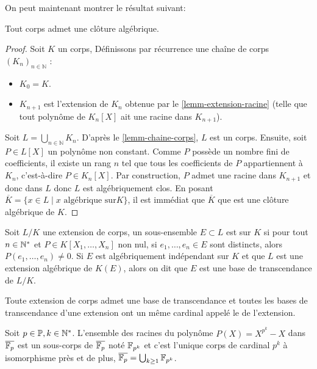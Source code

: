 On peut maintenant montrer le résultat suivant:

\begin{prop}\label{prop-existence-cloture-algebrique}
Tout corps admet une clôture algébrique.
\end{prop}

\begin{proof}
    Soit $K$ un corps,
    Définissons par récurrence une chaîne de corps $(K_n)_{n \in \mathbb{N}}$ :
    \begin{itemize}
        \item $K_0 = K$.
        \item $K_{n+1}$ est l'extension de $K_n$ obtenue par le \cref{lemm-extension-racine} (telle que tout polynôme de $K_n[X]$ ait une racine dans $K_{n+1}$).
    \end{itemize}
    
    Soit $L = \bigcup_{n \in \mathbb{N}} K_n$. D'après le \cref{lemm-chaine-corps}, $L$ est un corps.
    Ensuite, soit $P \in L[X]$ un polynôme non constant. 
    Comme $P$ possède un nombre fini de coefficients, il existe un rang $n$ tel que tous les coefficients de $P$ appartiennent à $K_n$, c'est-à-dire $P \in K_n[X]$.
    Par construction, $P$ admet une racine dans $K_{n+1}$ et donc dans $L$ donc
    $L$ est algébriquement clos.
    En posant $\overline{K}=  \{ x \in L \mid x \text{ algébrique sur} K \}$, il
    est immédiat que $\overline{K}$ que est une clôture algébrique de $K$.
\end{proof}


\begin{defi}
Soit $L/K$ une extension de corps, un sous-ensemble $E \subset L$ est
 sur $K$ si pour tout $n \in \mathbb{N}^{*}$ et $P \in
K[X_1, \ldots, X_n]$ non nul, si $e_1, \ldots, e_n \in E$ sont distincts, alors
$P(e_1,\ldots, e_n) \neq 0$.
Si $E$ est algébriquement indépendant sur $K$ et que $L$ est une extension algébrique de
$K(E)$, alors on dit que $E$ est une base de transcendance de $L/K$.
\end{defi}

\begin{prop}
Toute extension de corps admet une base de transcendance et toutes les bases de
transcendance d'une extension ont un même cardinal appelé le  de l'extension.
\end{prop}

\begin{theo}\label{theo-structure-corps-fini}
Soit $p \in \mathbb{P}, k \in \mathbb{N}^{*}$. 
L'ensemble des racines du polynôme $P(X) = X^{p^k} - X$ dans $\overline{\mathbb{F}_p}$
est un sous-corps de $\overline{\mathbb{F}_p}$ noté $\mathbb{F}_{p^k}$ et c'est l'unique corps
de cardinal $p^k$ à isomorphisme près et de plus, $\overline{\mathbb{F}_p} = \bigcup_{k
\ge 1} \mathbb{F}_{p^k}$.
\end{theo}

